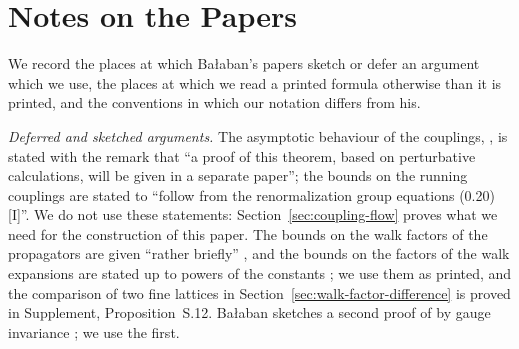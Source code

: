 \documentclass[11pt]{preprint}
\numberwithin{equation}{section}
\theoremstyle{definition}
\theoremstyle{remark}
\theoremstyle{plain}
\begin{document}
\section{Notes on the Papers}\label{sec:notes-on-papers}

We record the places at which Ba{\l}aban's papers sketch or defer an argument which we use, the places at which we read a printed formula otherwise than it is printed, and the conventions in which our notation differs from his.

\emph{Deferred and sketched arguments.} The asymptotic behaviour of the couplings, \cite[Theorem~2, (0.31), p.~259]{BalabanRG1}, is stated with the remark that ``a proof of this theorem, based on perturbative calculations, will be given in a separate paper''; the bounds \cite[(2.6), (2.7), p.~255]{BalabanCRE} on the running couplings are stated to ``follow from the renormalization group equations (0.20) [I]''. We do not use these statements: Section~\ref{sec:coupling-flow} proves what we need for the construction of this paper. The bounds on the walk factors of the propagators are given ``rather briefly'' \cite[p.~409]{BalabanPBG}, and the bounds on the factors of the walk expansions are stated up to powers of the constants \cite[p.~413]{BalabanPBG}; we use them as printed, and the comparison of two fine lattices in Section~\ref{sec:walk-factor-difference} is proved in Supplement, Proposition~S.12. Ba{\l}aban sketches a second proof of \cite[Theorem~2]{BalabanCRE} by gauge invariance \cite[pp.~283--284]{BalabanCRE}; we use the first.
\end{document}
